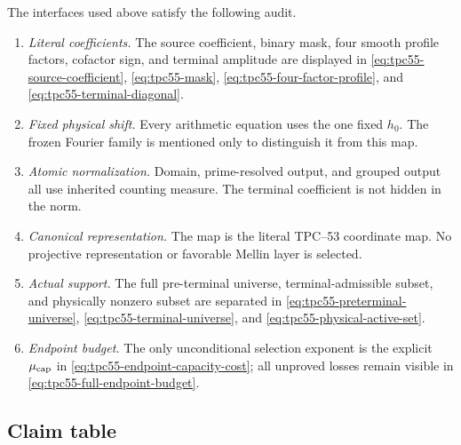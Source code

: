 The interfaces used above satisfy the following audit.
\begin{enumerate}[label=\textup{(A\arabic*)},leftmargin=3.2em]
 \item \emph{Literal coefficients.}
       The source coefficient, binary mask, four smooth profile factors,
       cofactor sign, and terminal amplitude are displayed in
       \eqref{eq:tpc55-source-coefficient},
       \eqref{eq:tpc55-mask},
       \eqref{eq:tpc55-four-factor-profile}, and
       \eqref{eq:tpc55-terminal-diagonal}.
 \item \emph{Fixed physical shift.}
       Every arithmetic equation uses the one fixed \(h_0\).  The frozen
       Fourier family is mentioned only to distinguish it from this map.
 \item \emph{Atomic normalization.}
       Domain, prime-resolved output, and grouped output all use inherited
       counting measure.  The terminal coefficient is not hidden in the
       norm.
 \item \emph{Canonical representation.}
       The map is the literal TPC--53 coordinate map.  No projective
       representation or favorable Mellin layer is selected.
 \item \emph{Actual support.}
       The full pre-terminal universe, terminal-admissible subset, and
       physically nonzero subset are separated in
       \eqref{eq:tpc55-preterminal-universe},
       \eqref{eq:tpc55-terminal-universe}, and
       \eqref{eq:tpc55-physical-active-set}.
 \item \emph{Endpoint budget.}
       The only unconditional selection exponent is the explicit
       \(\mu_{\rm cap}\) in \eqref{eq:tpc55-endpoint-capacity-cost}; all
       unproved losses remain visible in
       \eqref{eq:tpc55-full-endpoint-budget}.
\end{enumerate}

\subsection{Claim table}

